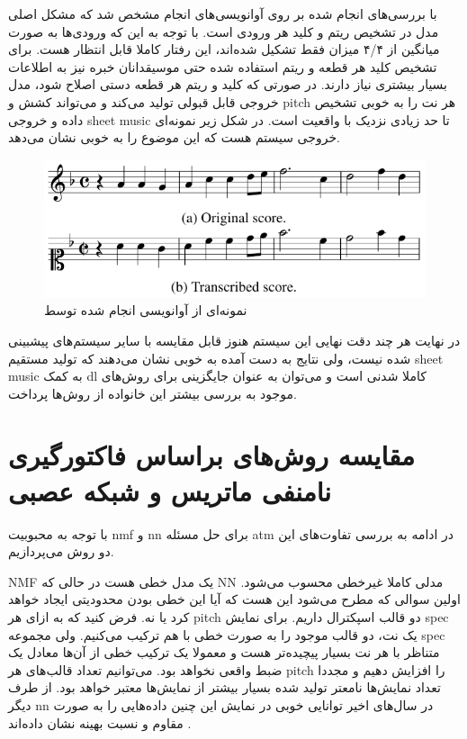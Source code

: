 با بررسی‌های انجام شده بر روی آوانویسی‌های انجام مشخص شد که مشکل اصلی مدل در
تشخیص ریتم و کلید هر ورودی است. با توجه به این که ورودی‌ها به صورت میانگین از
۴/۴ میزان فقط تشکیل شده‌اند، این رفتار کاملا قابل انتظار هست. برای تشخیص کلید هر
قطعه و ریتم استفاده شده حتی موسیقدانان خبره نیز به اطلاعات بسیار بیشتری نیاز
دارند. در صورتی که کلید و ریتم هر قطعه دستی اصلاح شود، مدل خروجی قابل قبولی
تولید می‌کند و می‌تواند کشش و \gls{pitch} هر نت را به خوبی تشخیص داده و خروجی
\gls{sheet music} تا حد زیادی نزدیک با واقعیت است. در شکل زیر نمونه‌ای خروجی
سیستم هست که این موضوع را به خوبی نشان می‌دهد.
\begin{figure}[ht]
    \centering
    \includegraphics[width=12cm]{./statics/roman2018end_output.png}
    \caption{نمونه‌ای از آوانویسی انجام شده توسط \cite{roman2018end}}
\end{figure}

در نهایت هر چند دقت نهایی این سیستم هنوز قابل مقایسه با سایر سیستم‌های پیشبینی
شده نیست، ولی نتایج به دست آمده به خوبی نشان می‌دهند که تولید مستقیم \gls{sheet
music} به کمک \gls{dl} کاملا شدنی است و می‌توان به عنوان جایگزینی برای روش‌های
موجود به بررسی بیشتر این خانواده از روش‌ها پرداخت.

\section{مقایسه روش‌های براساس فاکتورگیری نامنفی ماتریس و شبکه عصبی}
با توجه به محبوبیت \gls{nmf} و \gls{nn} برای حل مسئله \gls{atm} در ادامه به
بررسی تفاوت‌های این دو روش می‌پردازیم.

\gls{NMF} یک مدل خطی هست در حالی که \gls{NN} مدلی کاملا غیرخطی محسوب می‌شود.
اولین سوالی که مطرح می‌شود این هست که آیا این خطی بودن محدودیتی ایجاد خواهد کرد
یا نه. فرض کنید که به ازای هر \gls{pitch} دو قالب اسپکترال داریم. برای نمایش
\gls{spec} یک نت، دو قالب موجود را به صورت خطی با هم ترکیب می‌کنیم. ولی مجموعه
\gls{spec} متناظر با هر نت بسیار پیچیده‌تر هست و معمولا یک ترکیب خطی از آن‌ها
معادل یک ضبط واقعی نخواهد بود. می‌توانیم تعداد قالب‌های هر \gls{pitch} را افزایش
دهیم و مجددا تعداد نمایش‌ها نامعتر تولید شده بسیار بیشتر از نمایش‌ها معتبر خواهد
بود. از طرف دیگر \gls{nn} در سال‌های اخیر توانایی خوبی در نمایش این چنین
داده‌هایی را به صورت مقاوم و نسبت بهینه نشان داده‌اند \cite{goodfellow2016deep}.

